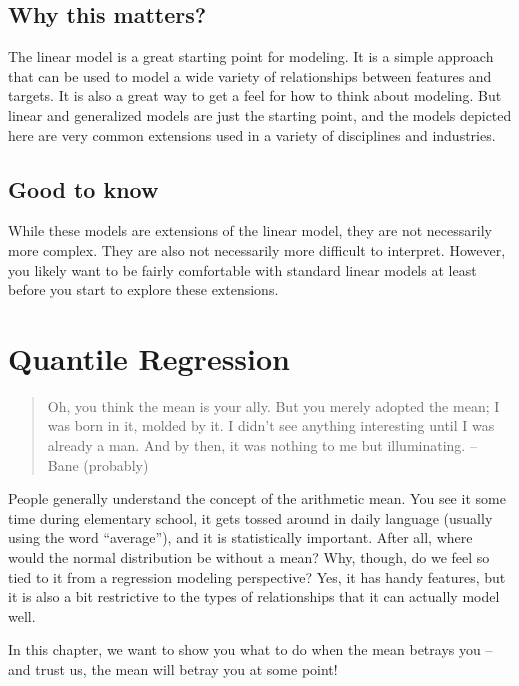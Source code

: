 \documentclass[
  letterpaper,
]{krantz}
\begin{document}
\subsection{Why this matters?}\label{sec-lm-extend-why}

The linear model is a great starting point for modeling. It is a simple
approach that can be used to model a wide variety of relationships
between features and targets. It is also a great way to get a feel for
how to think about modeling. But linear and generalized models are just
the starting point, and the models depicted here are very common
extensions used in a variety of disciplines and industries.

\subsection{Good to know}\label{sec-lm-extend-good}

While these models are extensions of the linear model, they are not
necessarily more complex. They are also not necessarily more difficult
to interpret. However, you likely want to be fairly comfortable with
standard linear models at least before you start to explore these
extensions.

\section{Quantile Regression}\label{sec-lm-extend-quantile}

\begin{quote}
Oh, you think the mean is your ally. But you merely adopted the mean; I
was born in it, molded by it. I didn't see anything interesting until I
was already a man. And by then, it was nothing to me but illuminating.
-- Bane (probably)
\end{quote}

People generally understand the concept of the arithmetic mean. You see
it some time during elementary school, it gets tossed around in daily
language (usually using the word ``average''), and it is statistically
important. After all, where would the normal distribution be without a
mean? Why, though, do we feel so tied to it from a regression modeling
perspective? Yes, it has handy features, but it is also a bit
restrictive to the types of relationships that it can actually model
well.

In this chapter, we want to show you what to do when the mean betrays
you -- and trust us, the mean will betray you at some point!
\end{document}
